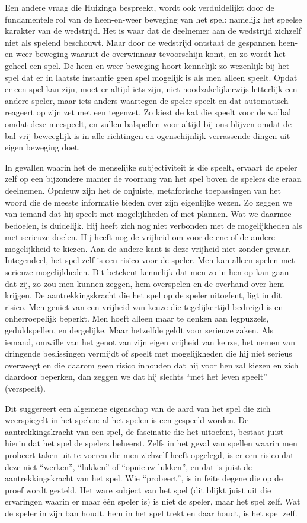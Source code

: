 Een andere vraag die Huizinga bespreekt, wordt ook verduidelijkt door de fundamentele rol van de heen-en-weer beweging van het spel: namelijk het speelse karakter van de wedstrijd. Het is waar dat de deelnemer aan de wedstrijd zichzelf niet als spelend beschouwt. Maar door de wedstrijd ontstaat de gespannen heen-en-weer beweging waaruit de overwinnaar tevoorschijn komt, en zo wordt het geheel een spel. De heen-en-weer beweging hoort kennelijk zo wezenlijk bij het spel dat er in laatste instantie geen spel mogelijk is als men alleen speelt. Opdat er een spel kan zijn, moet er altijd iets zijn, niet noodzakelijkerwijs letterlijk een andere speler, maar iets anders waartegen de speler speelt en dat automatisch reageert op zijn zet met een tegenzet. Zo kiest de kat die speelt voor de wolbal omdat deze meespeelt, en zullen balspellen voor altijd bij ons blijven omdat de bal vrij beweeglijk is in alle richtingen en ogenschijnlijk verrassende dingen uit eigen beweging doet.

In gevallen waarin het de menselijke subjectiviteit is die speelt, ervaart de speler zelf op een bijzondere manier de voorrang van het spel boven de spelers die eraan deelnemen. Opnieuw zijn het de onjuiste, metaforische toepassingen van het woord die de meeste informatie bieden over zijn eigenlijke wezen. Zo zeggen we van iemand dat hij speelt met mogelijkheden of met plannen. Wat we daarmee bedoelen, is duidelijk. Hij heeft zich nog niet verbonden met de mogelijkheden als met serieuze doelen. Hij heeft nog de vrijheid om voor de ene of de andere mogelijkheid te kiezen. Aan de andere kant is deze vrijheid niet zonder gevaar. Integendeel, het spel zelf is een risico voor de speler. Men kan alleen spelen met serieuze mogelijkheden. Dit betekent kennelijk dat men zo in hen op kan gaan dat zij, zo zou men kunnen zeggen, hem overspelen en de overhand over hem krijgen. De aantrekkingskracht die het spel op de speler uitoefent, ligt in dit risico. Men geniet van een vrijheid van keuze die tegelijkertijd bedreigd is en onherroepelijk beperkt. Men hoeft alleen maar te denken aan legpuzzels, geduldspellen, en dergelijke. Maar hetzelfde geldt voor serieuze zaken. Als iemand, omwille van het genot van zijn eigen vrijheid van keuze, het nemen van dringende beslissingen vermijdt of speelt met mogelijkheden die hij niet serieus overweegt en die daarom geen risico inhouden dat hij voor hen zal kiezen en zich daardoor beperken, dan zeggen we dat hij slechts ``met het leven speelt'' (verspeelt).

Dit suggereert een algemene eigenschap van de aard van het spel die zich weerspiegelt in het spelen: al het spelen is een gespeeld worden. De aantrekkingskracht van een spel, de fascinatie die het uitoefent, bestaat juist hierin dat het spel de spelers beheerst. Zelfs in het geval van spellen waarin men probeert taken uit te voeren die men zichzelf heeft opgelegd, is er een risico dat deze niet ``werken'', ``lukken'' of ``opnieuw lukken'', en dat is juist de aantrekkingskracht van het spel. Wie ``probeert'', is in feite degene die op de proef wordt gesteld. Het ware subject van het spel (dit blijkt juist uit die ervaringen waarin er maar één speler is) is niet de speler, maar het spel zelf. Wat de speler in zijn ban houdt, hem in het spel trekt en daar houdt, is het spel zelf.

